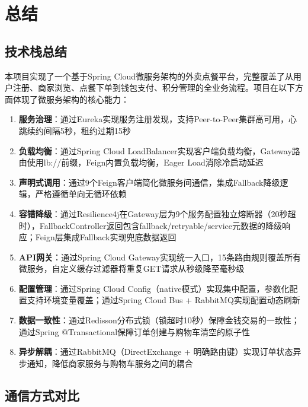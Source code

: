 
\chapter{总结}

\section{技术栈总结}

本项目实现了一个基于Spring Cloud微服务架构的外卖点餐平台，完整覆盖了从用户注册、商家浏览、点餐下单到钱包支付、积分管理的全业务流程。项目在以下方面体现了微服务架构的核心能力：

\begin{enumerate}
	\item \textbf{服务治理}：通过Eureka实现服务注册发现，支持Peer-to-Peer集群高可用，心跳续约间隔5秒，租约过期15秒
	\item \textbf{负载均衡}：通过Spring Cloud LoadBalancer实现客户端负载均衡，Gateway路由使用lb://前缀，Feign内置负载均衡，Eager Load消除冷启动延迟
	\item \textbf{声明式调用}：通过9个Feign客户端简化微服务间通信，集成Fallback降级逻辑，严格遵循单向无循环依赖
	\item \textbf{容错降级}：通过Resilience4j在Gateway层为9个服务配置独立熔断器（20秒超时），FallbackController返回包含fallback/retryable/service元数据的降级响应；Feign层集成Fallback实现兜底数据返回
	\item \textbf{API网关}：通过Spring Cloud Gateway实现统一入口，15条路由规则覆盖所有微服务，自定义缓存过滤器将重复GET请求从秒级降至毫秒级
	\item \textbf{配置管理}：通过Spring Cloud Config（native模式）实现集中配置，参数化配置支持环境变量覆盖；通过Spring Cloud Bus + RabbitMQ实现配置动态刷新
	\item \textbf{数据一致性}：通过Redisson分布式锁（锁超时10秒）保障金钱交易的一致性；通过Spring @Transactional保障订单创建与购物车清空的原子性
	\item \textbf{异步解耦}：通过RabbitMQ（DirectExchange + 明确路由键）实现订单状态异步通知，降低商家服务与购物车服务之间的耦合
\end{enumerate}

\section{通信方式对比}

